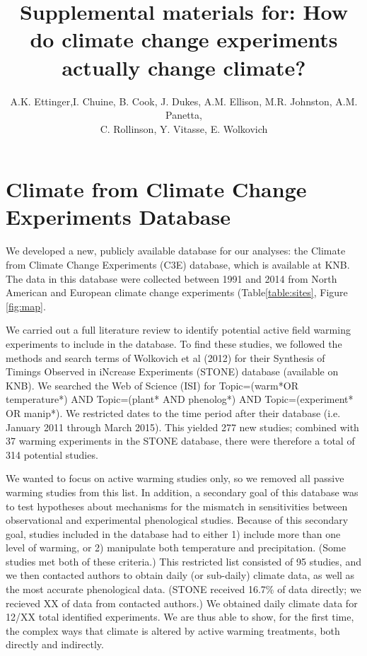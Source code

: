 \documentclass{article}
\begin{document}
 
\title{Supplemental materials for: How do climate change experiments actually change climate?} %

\author{A.K. Ettinger,I. Chuine, B. Cook, J. Dukes, A.M. Ellison, M.R. Johnston, A.M. Panetta,\\ C. Rollinson, Y. Vitasse, E. Wolkovich}
\maketitle  %


\section* {Climate from Climate Change Experiments Database}
We developed a new, publicly available database for our analyses: the Climate from Climate Change Experiments (C3E) database, which is available at KNB. The data in this database were collected between 1991 and 2014 from North American and European climate change experiments (Table\ref{table:sites}, Figure \ref{fig:map}. 
 \par We carried out a full literature review to identify potential active field warming experiments to include in the database. To find these studies, we followed the methods and search terms of Wolkovich et al (2012) for their Synthesis of Timings Observed in iNcrease Experiments (STONE) database (available on KNB). We searched the Web of Science (ISI) for Topic=(warm*OR temperature*) AND Topic=(plant* AND phenolog*) AND Topic=(experiment* OR manip*). We restricted dates to the time period after their database (i.e. January 2011 through March 2015). This yielded 277 new studies; combined with 37 warming experiments in the STONE database, there were therefore a total of 314 potential studies. 
 \par We wanted to focus on active warming studies only, so we removed all passive warming studies from this list. In addition, a secondary goal of this database was to test hypotheses about mechanisms for the mismatch in sensitivities between observational and experimental phenological studies. Because of this secondary goal, studies included in the database had to either 1) include more than one level of warming, or 2) manipulate both temperature and precipitation. (Some studies met both of these criteria.) This restricted list consisted of 95 studies, and we then contacted authors to obtain daily (or sub-daily) climate data, as well as the most accurate phenological data. (STONE received 16.7\% of data directly; we recieved XX of data from contacted authors.)
We obtained daily climate data for 12/XX total identified experiments. We are thus able to show, for the first time, the complex ways that climate is altered by active warming treatments, both directly and indirectly.
 
\end{document}
